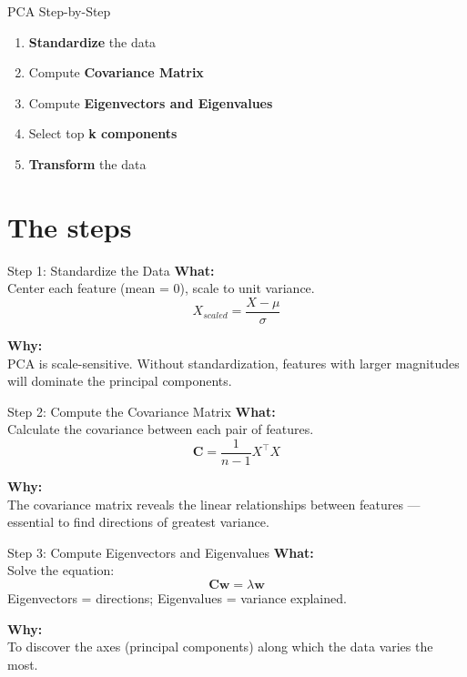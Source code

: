 \documentclass{beamer}
\begin{document}
\begin{frame}{PCA Step-by-Step}
\begin{enumerate}
    \item \textbf{Standardize} the data
    \item Compute \textbf{Covariance Matrix}
    \item Compute \textbf{Eigenvectors and Eigenvalues}
    \item Select top \textbf{k components}
    \item \textbf{Transform} the data
\end{enumerate}
\end{frame}

\section{The steps}
\begin{frame}{Step 1: Standardize the Data}
\small
\textbf{What:} \\
Center each feature (mean = 0), scale to unit variance. \\
\[
X_{scaled} = \frac{X - \mu}{\sigma}
\]

\vspace{1em}
\textbf{Why:} \\
PCA is scale-sensitive. Without standardization, features with larger magnitudes will dominate the principal components.
\end{frame}

\begin{frame}{Step 2: Compute the Covariance Matrix}
\small
\textbf{What:} \\
Calculate the covariance between each pair of features. \\
\[
\mathbf{C} = \frac{1}{n - 1} X^\top X
\]

\vspace{1em}
\textbf{Why:} \\
The covariance matrix reveals the linear relationships between features — essential to find directions of greatest variance.
\end{frame}

\begin{frame}{Step 3: Compute Eigenvectors and Eigenvalues}
\small
\textbf{What:} \\
Solve the equation: \\
\[
\mathbf{C} \mathbf{w} = \lambda \mathbf{w}
\] 
Eigenvectors = directions; Eigenvalues = variance explained.

\vspace{1em}
\textbf{Why:} \\
To discover the axes (principal components) along which the data varies the most.
\end{frame}
\end{document}
